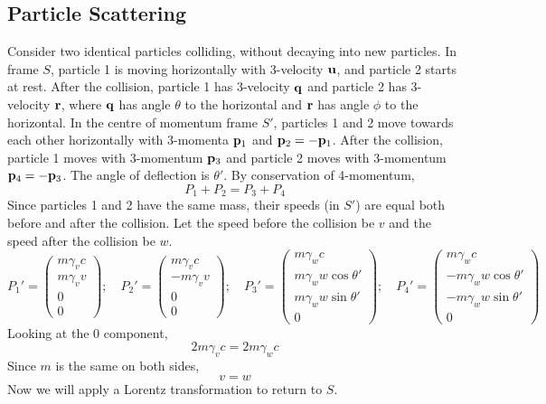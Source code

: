 \subsection{Particle Scattering}
Consider two identical particles colliding, without decaying into new particles.
In frame \(S\), particle 1 is moving horizontally with 3-velocity \(\vb u\), and particle 2 starts at rest.
After the collision, particle 1 has 3-velocity \(\vb q\) and particle 2 has 3-velocity \(\vb r\), where \(\vb q\) has angle \(\theta\) to the horizontal and \(\vb r\) has angle \(\phi\) to the horizontal.
In the centre of momentum frame \(S'\), particles 1 and 2 move towards each other horizontally with 3-momenta \(\vb p_1\) and \(\vb p_2 = -\vb p_1\).
After the collision, particle 1 moves with 3-momentum \(\vb p_3\) and particle 2 moves with 3-momentum \(\vb p_4 = -\vb p_3\).
The angle of deflection is \(\theta'\).
By conservation of 4-momentum,
\[
	P_1 + P_2 = P_3 + P_4
\]
Since particles 1 and 2 have the same mass, their speeds (in \(S'\)) are equal both before and after the collision.
Let the speed before the collision be \(v\) and the speed after the collision be \(w\).
\[
	P_1' = \begin{pmatrix}
		m\gamma_v c \\
		m\gamma_v v \\
		0           \\
		0
	\end{pmatrix};\quad P_2' = \begin{pmatrix}
		m\gamma_v c  \\
		-m\gamma_v v \\
		0            \\
		0
	\end{pmatrix};\quad P_3' = \begin{pmatrix}
		m\gamma_w c             \\
		m\gamma_w w \cos\theta' \\
		m\gamma_w w \sin\theta' \\
		0
	\end{pmatrix};\quad P_4' = \begin{pmatrix}
		m\gamma_w c              \\
		-m\gamma_w w \cos\theta' \\
		-m\gamma_w w \sin\theta' \\
		0
	\end{pmatrix}
\]
Looking at the 0 component,
\[
	2 m\gamma_v c = 2m\gamma_w c
\]
Since \(m\) is the same on both sides,
\[
	v = w
\]
Now we will apply a Lorentz transformation to return to \(S\).
